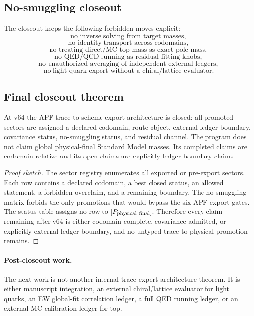\subsection{No-smuggling closeout}

The closeout keeps the following forbidden moves explicit:
\[
\boxed{\text{no inverse solving from target masses}},
\]
\[
\boxed{\text{no identity transport across codomains}},
\]
\[
\boxed{\text{no treating direct/MC top mass as exact pole mass}},
\]
\[
\boxed{\text{no QED/QCD running as residual-fitting knobs}},
\]
\[
\boxed{\text{no unauthorized averaging of independent external ledgers}},
\]
\[
\boxed{\text{no light-quark export without a chiral/lattice evaluator}}.
\]

\subsection{Final closeout theorem}

\begin{theorem}
At v64 the APF trace-to-scheme export architecture is closed: all promoted sectors are assigned a declared codomain, route object, external ledger boundary, covariance status, no-smuggling status, and residual channel.  The program does not claim global physical-final Standard Model masses.  Its completed claims are codomain-relative and its open claims are explicitly ledger-boundary claims.
\end{theorem}

\begin{proof}[Proof sketch]
The sector registry enumerates all exported or pre-export sectors.  Each row contains a declared codomain, a best closed status, an allowed statement, a forbidden overclaim, and a remaining boundary.  The no-smuggling matrix forbids the only promotions that would bypass the six APF export gates.  The status table assigns no row to \([P_{\rm physical\ final}]\).  Therefore every claim remaining after v64 is either codomain-complete, covariance-admitted, or explicitly external-ledger-boundary, and no untyped trace-to-physical promotion remains.
\end{proof}

\paragraph{Post-closeout work.}
The next work is not another internal trace-export architecture theorem.  It is either manuscript integration, an external chiral/lattice evaluator for light quarks, an EW global-fit correlation ledger, a full QED running ledger, or an external MC calibration ledger for top.

